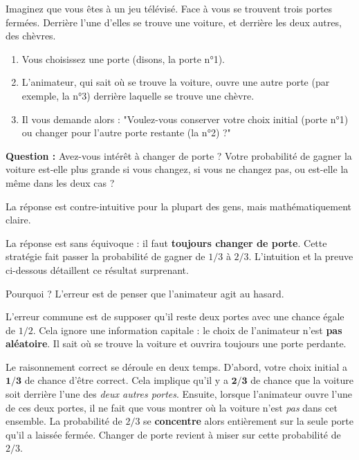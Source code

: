 \begin{remarquebox}
Imaginez que vous êtes à un jeu télévisé. Face à vous se trouvent trois portes fermées. Derrière l'une d'elles se trouve une voiture, et derrière les deux autres, des chèvres.
\begin{enumerate}
    \item Vous choisissez une porte (disons, la porte n°1).
    \item L'animateur, qui sait où se trouve la voiture, ouvre une autre porte (par exemple, la n°3) derrière laquelle se trouve une chèvre.
    \item Il vous demande alors : "Voulez-vous conserver votre choix initial (porte n°1) ou changer pour l'autre porte restante (la n°2) ?"
\end{enumerate}
\textbf{Question :} Avez-vous intérêt à changer de porte ? Votre probabilité de gagner la voiture est-elle plus grande si vous changez, si vous ne changez pas, ou est-elle la même dans les deux cas ?
\end{remarquebox}

La réponse est contre-intuitive pour la plupart des gens, mais mathématiquement claire.

\begin{correctionbox}
La réponse est sans équivoque : il faut \textbf{toujours changer de porte}. Cette stratégie fait passer la probabilité de gagner de $1/3$ à $2/3$. L'intuition et la preuve ci-dessous détaillent ce résultat surprenant.
\end{correctionbox}

Pourquoi ? L'erreur est de penser que l'animateur agit au hasard.

\begin{intuitionbox}
L'erreur commune est de supposer qu'il reste deux portes avec une chance égale de $1/2$. Cela ignore une information capitale : le choix de l'animateur n'est \textbf{pas aléatoire}. Il sait où se trouve la voiture et ouvrira toujours une porte perdante.

Le raisonnement correct se déroule en deux temps. D'abord, votre choix initial a $\mathbf{1/3}$ de chance d'être correct. Cela implique qu'il y a $\mathbf{2/3}$ de chance que la voiture soit derrière l'une des \textit{deux autres portes}. Ensuite, lorsque l'animateur ouvre l'une de ces deux portes, il ne fait que vous montrer où la voiture n'est \textit{pas} dans cet ensemble. La probabilité de $2/3$ se \textbf{concentre} alors entièrement sur la seule porte qu'il a laissée fermée. Changer de porte revient à miser sur cette probabilité de $2/3$.
\end{intuitionbox}

